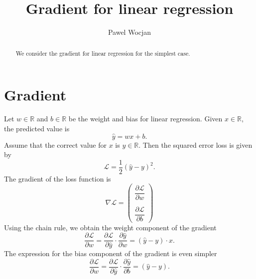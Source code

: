 \documentclass[12pt]{article}
\title{Gradient for linear regression}
\author{Pawel Wocjan}
\newcommand{\R}{\mathbb{R}}
\begin{document}
\maketitle


\begin{abstract}
We consider the gradient for linear regression for the simplest case.
\end{abstract}

\section{Gradient}

Let $w\in\R$ and $b\in\R$ be the weight and bias for linear regression.  Given $x\in\R$, the predicted value is
\begin{equation}
\hat{y} = w x + b.
\end{equation}
Assume that the correct value for $x$ is $y\in \R$.  Then the squared error loss is given by
\begin{equation}
\mathcal{L} = \frac{1}{2}(\hat{y}-y)^2.
\end{equation}
The gradient of the loss function is 
\begin{equation}
\nabla\mathcal{L} = \left(
\begin{array}{c}
\dfrac{\partial \mathcal{L}}{\partial w}  \\
\\
\dfrac{\partial \mathcal{L}}{\partial b} 
\end{array}
\right)
\end{equation}
Using the chain rule, we obtain the weight component of the gradient
\begin{equation}
\dfrac{\partial \mathcal{L}}{\partial w} =
\dfrac{\partial \mathcal{L}}{\partial\hat{y}} \cdot \dfrac{\partial \hat{y}}{\partial w} =
(\hat{y} - y) \cdot x.
\end{equation}
The expression for the bias component of the gradient is even simpler
\begin{equation}
\dfrac{\partial \mathcal{L}}{\partial w} =
\dfrac{\partial \mathcal{L}}{\partial\hat{y}} \cdot \dfrac{\partial \hat{y}}{\partial b} =
(\hat{y} - y).
\end{equation}
\end{document}
